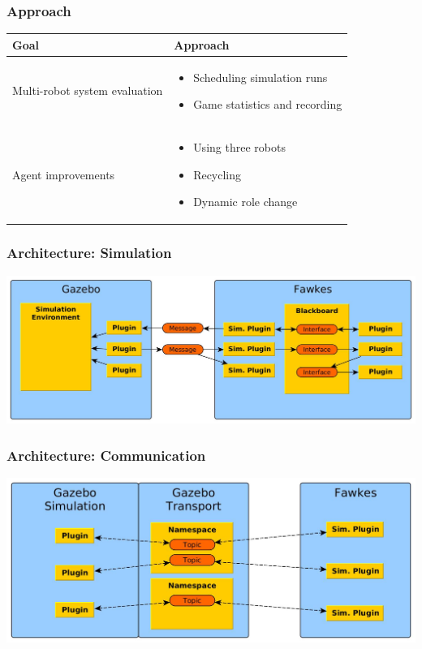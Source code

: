 \documentclass[]{beamer}
\begin{document}
\begin{frame}
  \frametitle{Approach}
  \begin{tabular}{p{3.7cm}|p{7.5cm}}
    \hline
    \large{\textbf{Goal}} & \large{\textbf{Approach}}\\
    \hline
    Multi-robot system evaluation & \begin{itemize} \item Scheduling simulation runs \item Game statistics and recording \end{itemize} \pause \\ %
    \hline
    Agent improvements & \begin{itemize} \item Using three robots \item Recycling \item Dynamic role change \end{itemize}\\ %
    \hline    
  \end{tabular}
\end{frame}


\begin{frame}
  \frametitle{Architecture: Simulation}
  \includegraphics[width=\textwidth]{../tabs/fawkes_gazebo.jpg}
\end{frame}

\begin{frame}
  \frametitle{Architecture: Communication}
  \includegraphics[width=\textwidth]{../tabs/communication.jpg}
\end{frame}
\end{document}
